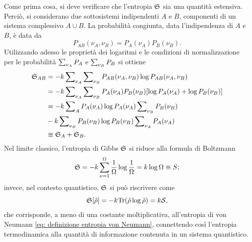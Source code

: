 Come prima cosa, si deve verificare che l'entropia $\mathfrak{S}$ sia una quantità estensiva. Perciò, si considerano due sottosistemi indipendenti $A$ e $B$, componenti di un sistema complessivo $A\cup B$. La probabilità congiunta, data l'indipendenza di $A$ e $B$, è data da 
\begin{equation}
    P_{AB}(\nu_A,\nu_B) = P_A(\nu_A)P_B(\nu_B).
\end{equation}
Utilizzando adesso le proprietà dei logaritmi e le condizioni di normalizzazione per le probabilità $\sum\nolimits_{\nu_A}P_A$ e $\sum\nolimits_{\nu_B}P_B$ si ottiene
\begin{equation}
    \begin{split}
        \mathfrak{S}_{AB} &= -k\sum\nolimits_{\nu_A}\sum\nolimits_{\nu_B}P_{AB}(\nu_A,\nu_B)\log{ P_{AB}(\nu_A,\nu_B)} \\
        &= -k\sum\nolimits_{\nu_A}\sum\nolimits_{\nu_B}P_A(\nu_A)P_B(\nu_B)[\log{P_A(\nu_A)} + \log{P_B(\nu_B)}] \\
        &=-k\sum\nolimits_AP_A(\nu_A)\log{P_A(\nu_A)}\sum\nolimits_{\nu_B}P_B(\nu_B) \\
        &-k\sum\nolimits_{\nu_B}P_B(\nu_B)\log{P_B(\nu_B)}\sum\nolimits_{\nu_A}P_A(\nu_A) \\
        &\equiv \mathfrak{S}_A + \mathfrak{S}_B.
    \end{split}
\end{equation}
Nel limite classico, l'entropia di Gibbs $\mathfrak{S}$ si riduce alla formula di Boltzmann
\begin{equation}
    \mathfrak{S} = -k\sum_{\nu = 1}^\Omega\frac{1}{\Omega}\log{\frac{1}{\Omega}} = k\log{\Omega} \equiv S;
\end{equation}
invece, nel contesto quantistico, $\mathfrak{S}$ si può riscrivere come
\begin{equation}
    \mathfrak{S}[\hat{\rho}] = -k\mathrm{Tr}(\hat{\rho}\log{\hat{\rho}}) = k\mathcal{S},
\end{equation}
che corrisponde, a meno di una costante moltiplicativa, all'entropia di von Neumann \eqref{eq: definizione entropia von Neumann}, connettendo così l'entropia termodinamica alla quantità di informazione contenuta in un sistema quantistico.

